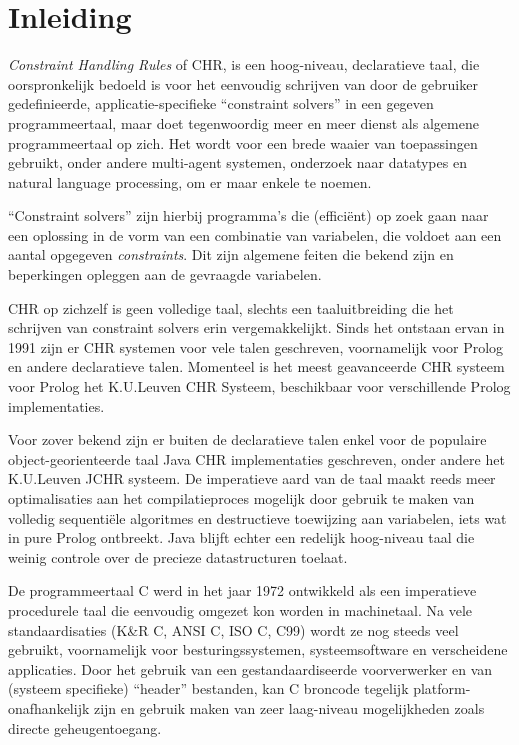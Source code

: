 \chapter{Inleiding}
\label{chap:inleiding}

{\em Constraint Handling Rules} of CHR, is een hoog-niveau, declaratieve taal, die oorspronkelijk bedoeld is voor het eenvoudig schrijven van door de gebruiker gedefinieerde, applicatie-specifieke ``constraint solvers'' in een gegeven programmeertaal, maar doet tegenwoordig meer en meer dienst als algemene programmeertaal op zich. Het wordt voor een brede waaier van toepassingen gebruikt, onder andere multi-agent systemen, onderzoek naar datatypes en natural language processing, om er maar enkele te noemen.

``Constraint solvers'' zijn hierbij programma's die (effici\"ent) op zoek gaan naar een oplossing in de vorm van een combinatie van variabelen, die voldoet aan een aantal opgegeven {\em constraints}. Dit zijn algemene feiten die bekend zijn en beperkingen opleggen aan de gevraagde variabelen.

CHR op zichzelf is geen volledige taal, slechts een taaluitbreiding die het schrijven van constraint solvers erin vergemakkelijkt. Sinds het ontstaan ervan in 1991 zijn er CHR systemen voor vele talen geschreven, voornamelijk voor Prolog en andere declaratieve talen. Momenteel is het meest geavanceerde CHR systeem voor Prolog het K.U.Leuven CHR Systeem, beschikbaar voor verschillende Prolog implementaties. 

Voor zover bekend zijn er buiten de declaratieve talen enkel voor de populaire object-georienteerde taal Java CHR implementaties geschreven, onder andere het K.U.Leuven JCHR systeem. De imperatieve aard van de taal maakt reeds meer optimalisaties aan het compilatieproces mogelijk door gebruik te maken van volledig sequenti\"ele algoritmes en destructieve toewijzing aan variabelen, iets wat in pure Prolog ontbreekt. Java blijft echter een redelijk hoog-niveau taal die weinig controle over de precieze datastructuren toelaat.

De programmeertaal C werd in het jaar 1972 ontwikkeld als een imperatieve procedurele taal die eenvoudig omgezet kon worden in machinetaal. Na vele standaardisaties (K\&R C, ANSI C, ISO C, C99) wordt ze nog steeds veel gebruikt, voornamelijk voor besturingssystemen, systeemsoftware en verscheidene applicaties. Door het gebruik van een gestandaardiseerde voorverwerker en van (systeem specifieke) ``header'' bestanden, kan C broncode tegelijk platform-onafhankelijk zijn en gebruik maken van zeer laag-niveau mogelijkheden zoals directe geheugentoegang.

